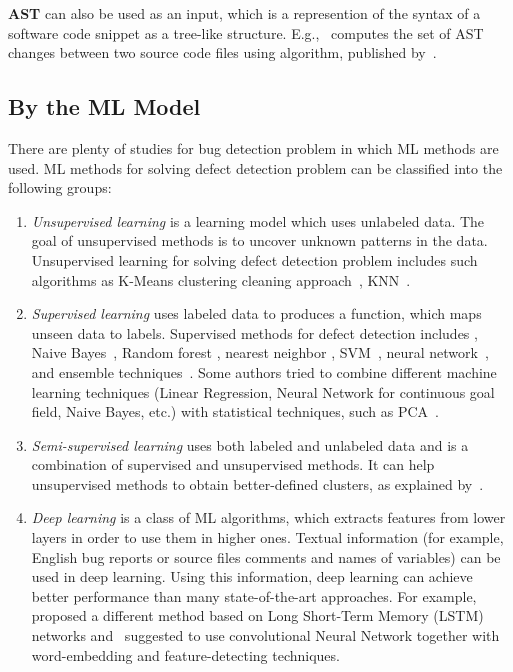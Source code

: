 \textbf{AST} can also be used
as an input, which is a represention of the syntax of a 
software code snippet as a tree-like structure. 
E.g.,~\citet{6676914} computes the set of AST changes between two source
code files using algorithm, published by~\citet{4339230}.

\subsection{By the ML Model}

There are plenty of studies for bug detection problem 
in which ML methods are used. ML methods 
for solving defect detection problem can be classified into the following groups: 

\begin{enumerate}[label=\arabic*)]
\item \emph{Unsupervised learning} is a learning model which uses unlabeled data.
The goal of unsupervised methods is to uncover unknown patterns in the data. 
Unsupervised learning for solving defect detection problem includes such algorithms 
as K-Means clustering cleaning approach~\citep{8952192}, KNN~\citep{8777507}.

\item \emph{Supervised learning} uses labeled data to produces a function, 
which maps unseen data to labels. Supervised methods for defect detection includes
\citep{10.1145/1137983.1138012}, Naive Bayes~\citep{4027145}, Random forest 
\citep{1383136, 7476673}, nearest neighbor 
\citep{10.1145/2786805.2786813}, SVM~\citep{ELISH2008649, 10_1007}, 
neural network~\citep{THWIN2005147THWIN2005147},~\citep{1033229, 10.1145/3360588} and ensemble techniques~\citep{Ensemble_Techniques}.
Some authors tried to combine different machine learning techniques 
(Linear Regression, Neural Network for continuous goal field, Naive Bayes, etc.) 
with statistical techniques, such as PCA~\citep{1544801}.

\item \emph{Semi-supervised learning} uses both labeled and unlabeled data and
is a combination of supervised and unsupervised methods. 
It can help unsupervised methods to obtain better-defined clusters,
as explained by~\citet{semi_supervised_learning, 7965301, Zhang2017}.

\item \emph{Deep learning} is a class of ML algorithms, which extracts
features from lower layers in order to use them in higher ones.
Textual information (for example, English bug reports
or source files comments and names of variables) can be used in deep learning. 
Using this information, deep learning 
can achieve better performance than many state-of-the-art approaches.
For example,~\citet{8616596} proposed a different method based 
on Long Short-Term Memory (LSTM) networks 
and~\citet{XIAO201917} suggested to use 
convolutional Neural Network together 
with word-embedding and feature-detecting techniques. 
\end{enumerate}
